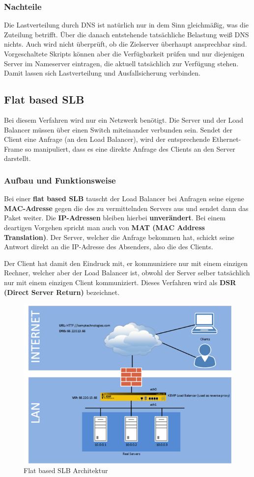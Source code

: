 \subsubsection{Nachteile}
Die Lastverteilung durch DNS ist natürlich nur in dem Sinn gleichmäßig, was die Zuteilung betrifft. Über die danach entstehende tatsächliche Belastung weiß DNS nichts. Auch wird nicht überprüft, ob die Zielserver überhaupt ansprechbar sind. Vorgeschaltete Skripts können aber die Verfügbarkeit prüfen und nur diejenigen Server im Nameserver eintragen, die aktuell tatsächlich zur Verfügung stehen. Damit lassen sich Lastverteilung und Ausfallsicherung verbinden.


\newpage

\subsection{Flat based SLB}

Bei diesem Verfahren wird nur ein Netzwerk benötigt. Die Server und der Load Balancer müssen über einen Switch miteinander verbunden sein. Sendet der Client eine Anfrage (an den Load Balancer), wird der entsprechende Ethernet-Frame so manipuliert, dass es eine direkte Anfrage des Clients an den Server darstellt.

\subsubsection{Aufbau und Funktionsweise}
Bei einer \textbf{flat based SLB}  tauscht der Load Balancer bei Anfragen seine eigene \textbf{MAC-Adresse} gegen die des zu vermittelnden Servers aus und sendet dann das Paket weiter. Die \textbf{IP-Adressen} bleiben hierbei \textbf{unverändert}. Bei einem deartigen Vorgehen spricht man auch von \textbf{MAT (MAC Address Translation)}. Der Server, welcher die Anfrage bekommen hat, schickt seine Antwort direkt an die IP-Adresse des Absenders, also die des Clients.

Der Client hat damit den Eindruck mit, er kommuniziere nur mit einem einzigen Rechner, welcher aber der Load Balancer ist, obwohl der Server selber tatsächlich nur mit einem einzigen Client kommuniziert. Dieses Verfahren wird als \textbf{DSR (Direct Server Return)} bezeichnet.

\begin{figure}[!h]
	\begin{center}
		\includegraphics[width=0.5\linewidth]{images/flat_slb}
		\caption{Flat based SLB Architektur }
		\label{flat_based_SLB}
	\end{center}
\end{figure}

